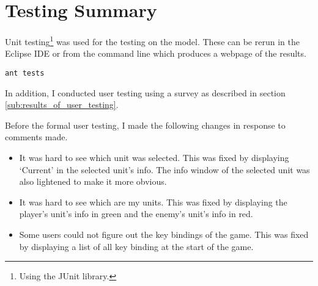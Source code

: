 \section{Testing Summary}

Unit testing\footnote{Using the JUnit library.} was used for the testing on the model. These can be rerun in the Eclipse IDE or from the command line which produces a webpage of the results.

\begin{lstlisting}[caption=Commend to make a webpage of the result of the unit testing]
	ant tests
\end{lstlisting}

In addition, I conducted user testing using a survey as described in section \ref{sub:results_of_user_testing}. 

Before the formal user testing, I made the following changes in response to comments made. 

\begin{itemize}
	\item It was hard to see which unit was selected. This was fixed by  displaying `Current' in the selected unit's info. The info window of the selected unit was also lightened to make it more obvious.
	
	\item It was hard to see which are my units. This was fixed by displaying the player's unit's info in green and the enemy's unit's info in red. 
	
	\item Some users could not figure out the key bindings of the game. This was fixed by displaying a list of all key binding at the start of the game.
\end{itemize}

